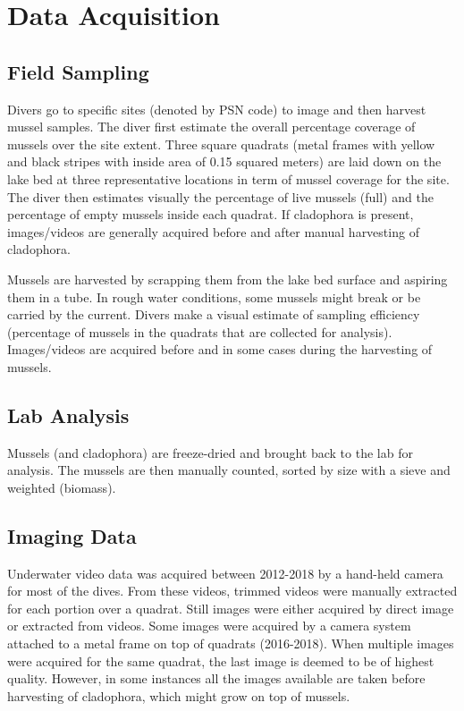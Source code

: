 \documentclass[11pt]{article} %
\begin{document}
\iffalse

\section{Data Acquisition}

\subsection{Field Sampling}

Divers go to specific sites (denoted by PSN code) to image and then harvest mussel samples. The diver first estimate the overall percentage coverage of mussels over the site extent. Three square quadrats (metal frames with yellow and black stripes with inside area of 0.15 squared meters) are laid down on the lake bed at three representative locations in term of mussel coverage for the site. The diver then estimates visually the percentage of live mussels (full) and the percentage of empty mussels inside each quadrat. If cladophora is present, images/videos are generally acquired before and after manual harvesting of cladophora.

Mussels are harvested by scrapping them from the lake bed surface and aspiring them in a tube. In rough water conditions, some mussels might break or be carried by the current. Divers make a visual estimate of sampling efficiency (percentage of mussels in the quadrats that are collected for analysis). Images/videos are acquired before and in some cases during the harvesting of mussels.

\subsection{Lab Analysis}
Mussels (and cladophora) are freeze-dried and brought back to the lab for analysis. The mussels are then manually counted, sorted by size with a sieve and weighted (biomass).

\subsection{Imaging Data}
Underwater video data was acquired between 2012-2018 by a hand-held camera for most of the dives. From these videos, trimmed videos were manually extracted for each portion over a quadrat. Still images were either acquired by direct image or extracted from videos. Some images were acquired by a camera system attached to a metal frame on top of quadrats (2016-2018). When multiple images were acquired for the same quadrat, the last image is deemed to be of highest quality. However, in some instances all the images available are taken before harvesting of cladophora, which might grow on top of mussels.
\end{document}
